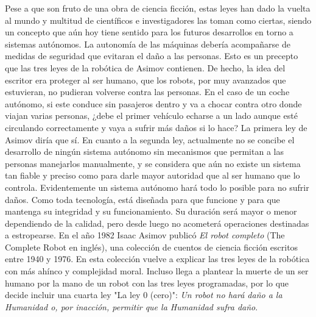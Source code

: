 Pese a que son fruto de una obra de ciencia ficción, estas leyes han dado la vuelta al mundo y multitud de científicos e investigadores las toman como ciertas, siendo un concepto que aún hoy tiene sentido para los futuros desarrollos en torno a sistemas autónomos. La autonomía de las máquinas debería acompañarse de medidas de seguridad que evitaran el daño a las personas. Esto es un precepto que las tres leyes de la robótica de Asimov contienen. De hecho, la idea del escritor era proteger al ser humano, que los robots, por muy avanzados que estuvieran, no pudieran volverse contra las personas. En el caso de un coche autónomo, si este conduce sin pasajeros dentro y va a chocar contra otro donde viajan varias personas, ¿debe el primer vehículo echarse a un lado aunque esté circulando correctamente y vaya a sufrir más daños si lo hace? La primera ley de Asimov diría que sí. En cuanto a la segunda ley, actualmente no se concibe el desarrollo de ningún sistema autónomo sin mecanismos que permitan a las personas manejarlos manualmente, y se considera que aún no existe un sistema tan fiable y preciso como para darle mayor autoridad que al ser humano que lo controla. Evidentemente un sistema autónomo hará todo lo posible para no sufrir daños. Como toda tecnología, está diseñada para que funcione y para que mantenga su integridad y su funcionamiento. Su duración será mayor o menor dependiendo de la calidad, pero desde luego no acometerá operaciones destinadas a estropearse. En el año 1982 Isaac Asimov publicó \textit{El robot completo} (The Complete Robot en inglés), una colección de cuentos de ciencia ficción escritos entre 1940 y 1976. En esta colección vuelve a explicar las tres leyes de la robótica con más ahínco y complejidad moral. Incluso llega a plantear la muerte de un ser humano por la mano de un robot con las tres leyes programadas, por lo que decide incluir una cuarta ley "La ley 0 (cero)": \textit{Un robot no hará daño a la Humanidad o, por inacción, permitir que la Humanidad sufra daño}.

